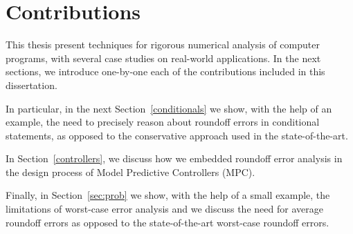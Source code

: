 \section{Contributions}
%
This thesis present techniques for rigorous numerical analysis of computer programs, with several case studies on real-world applications.
%
%
%
In the next sections, we introduce one-by-one each of the contributions included in this dissertation.
%

In particular, in the next Section~\ref{conditionals} we show, with the help of an example, the need to precisely reason about roundoff errors in conditional statements, as opposed to the conservative approach used in the state-of-the-art.
%

In Section~\ref{controllers}, we discuss how we embedded roundoff error analysis in the design process of Model Predictive Controllers (MPC).
%

Finally, in Section~\ref{sec:prob} we show, with the help of a small example, the limitations of worst-case error analysis and we discuss the need for average roundoff errors as opposed to the state-of-the-art worst-case roundoff errors.
%
%

%
%
%
%
%

